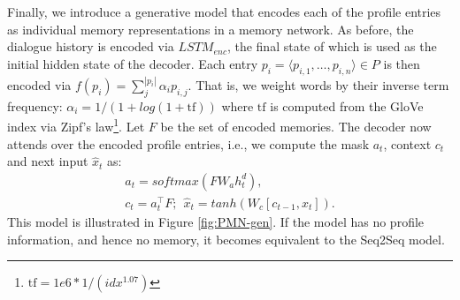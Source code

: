 Finally, we introduce a generative model that encodes each of the profile entries as individual memory representations in a memory network. As before, the dialogue history is encoded via $LSTM_{enc}$, the final state of which is used as the initial hidden state of the decoder. Each entry $p_i = \langle p_{i,1}, \ldots, p_{i,n} \rangle \in P$ is then encoded via $f(p_i) = \sum_j^{|p_i|} \alpha_i p_{i,j}$. That is, we weight words by their inverse term frequency: $\alpha_i = 1 / (1 + log(1 + \text{tf}))$ where $\text{tf}$ is computed from the GloVe index via Zipf's law\footnote{$\text{tf} = 1e6 * 1/(idx^{1.07})$}. Let $F$ be the set of encoded memories. The decoder now attends over the encoded profile entries, i.e., we compute the mask $a_t$, context $c_t$ and next input $\hat{x}_t$ as:
\begin{eqnarray*}
a_t = softmax(F W_a h^d_t), \\
c_t = a_t^\intercal F; ~~\hat{x}_t = tanh(W_c [c_{t-1}, x_t]).
\end{eqnarray*}
\ifarxiv
This model is illustrated in Figure \ref{fig:PMN-gen}.
\fi
If the model has no profile information, and hence no memory, it becomes equivalent to the Seq2Seq model.

